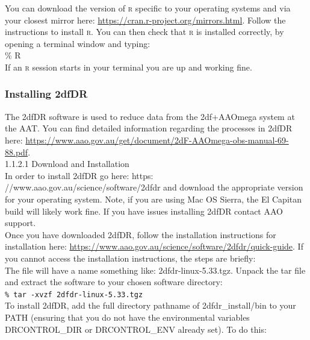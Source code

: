 \documentclass[12pt]{article}
\begin{document}
You can download the version of \textsc{r} specific to your operating systems and via your closest mirror here: \url{https://cran.r-project.org/mirrors.html}. Follow the instructions to install \textsc{r}. You can then check that \textsc{r} is installed correctly, by opening a terminal window and typing: \\


\hspace{10mm} \% R\\

If an \textsc{r} session starts in your terminal you are up and working fine.

\subsubsection{Installing 2dfDR}

The 2dfDR software is used to reduce data from the 2df+AAOmega system at the AAT. You can find detailed information regarding the processes in 2dfDR here:  \url{https://www.aao.gov.au/get/document/2dF-AAOmega-obs-manual-69-88.pdf}.  \\

\textsf{1.1.2.1 Download and Installation} \\

In order to install 2dfDR go here: https: //www.aao.gov.au/science/software/2dfdr and download the appropriate version for your operating system. Note, if you are using Mac OS Sierra, the El Capitan build will likely work fine. If you have issues installing 2dfDR contact AAO support. \\

Once you have downloaded 2dfDR, follow the installation instructions for installation here: \url{https://www.aao.gov.au/science/software/2dfdr/quick-guide}. If you cannot access the installation instructions, the steps are briefly: \\

The file will have a name something like: 2dfdr-linux-5.33.tgz. Unpack the tar file and extract the software to your chosen software directory:\\

\hspace{10mm} \texttt{\% tar -xvzf 2dfdr-linux-5.33.tgz}\\

To install 2dfDR, add the full directory pathname of 2dfdr\_install/bin to your PATH (ensuring that you do not have the environmental variables DRCONTROL\_DIR or DRCONTROL\_ENV already set). To do this: \\
\end{document}
